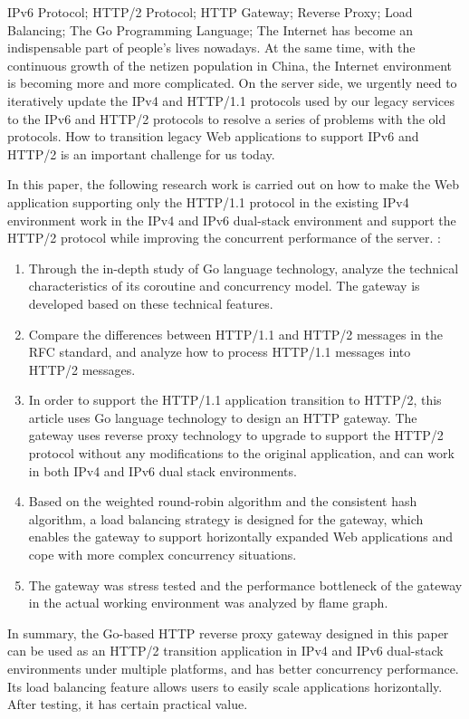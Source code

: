 \documentclass[twoside]{CUGThesis}
\begin{document}
	\begin{enabstract}{IPv6 Protocol; HTTP/2 Protocol; HTTP Gateway; Reverse Proxy; Load Balancing; The Go Programming Language;}
		The Internet has become an indispensable part of people's lives nowadays.
		At the same time, with the continuous growth of the netizen population in China, the Internet environment is becoming 
		more and more complicated. On the server side, we urgently need to iteratively update the IPv4 and HTTP/1.1 protocols
		 used by our legacy services to the IPv6 and HTTP/2 protocols to resolve a series of problems with the old protocols.
		  How to transition legacy Web applications to support IPv6 and HTTP/2 is an important challenge for us today.\par 
		  In this paper, the following research work is carried out on how to make the Web application supporting only the
		   HTTP/1.1 protocol in the existing IPv4 environment work in the IPv4 and IPv6 dual-stack environment and support
		  the HTTP/2 protocol while improving the concurrent performance of the server. :\par 
		 \begin{enumerate}
			\item  Through the in-depth study of Go language technology, analyze the technical characteristics of its coroutine and concurrency model. The gateway is developed based on these technical features.
			\item Compare the differences between HTTP/1.1 and HTTP/2 messages in the RFC standard, and analyze how to process HTTP/1.1 messages into HTTP/2 messages.
			\item  In order to support the HTTP/1.1 application transition to HTTP/2, this article uses Go language technology to design an HTTP gateway. The gateway uses reverse proxy technology to upgrade to support the HTTP/2 protocol without any modifications to the original application, and can work in both IPv4 and IPv6 dual stack environments.
			 \item Based on the weighted round-robin algorithm and the consistent hash algorithm, a load balancing strategy is designed for the gateway, which enables the gateway to support horizontally expanded Web applications and cope with more complex concurrency situations.
			 \item The gateway was stress tested and the performance bottleneck of the gateway in the actual working environment was analyzed by flame graph.
		 \end{enumerate}
		 \par
		 In summary, the Go-based HTTP reverse proxy gateway designed in this paper can be used as an HTTP/2 transition application in IPv4 and IPv6 dual-stack environments under multiple platforms, and has better concurrency performance. Its load balancing feature allows users to easily scale applications horizontally. After testing, it has certain practical value.
	\end{enabstract}
	
\end{document}
